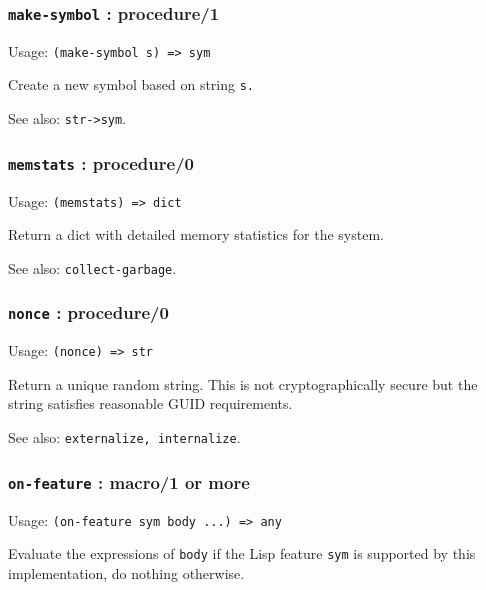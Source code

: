 \documentclass[
]{article}
\newcommand{\passthrough}[1]{#1}
\begin{document}
\hypertarget{make-symbol-procedure1}{%
\subsubsection{\texorpdfstring{\texttt{make-symbol} :
procedure/1}{make-symbol : procedure/1}}\label{make-symbol-procedure1}}

Usage: \passthrough{\lstinline!(make-symbol s) => sym!}

Create a new symbol based on string \passthrough{\lstinline!s.!}

See also: \passthrough{\lstinline!str->sym!}.

\hypertarget{memstats-procedure0}{%
\subsubsection{\texorpdfstring{\texttt{memstats} :
procedure/0}{memstats : procedure/0}}\label{memstats-procedure0}}

Usage: \passthrough{\lstinline!(memstats) => dict!}

Return a dict with detailed memory statistics for the system.

See also: \passthrough{\lstinline!collect-garbage!}.

\hypertarget{nonce-procedure0}{%
\subsubsection{\texorpdfstring{\texttt{nonce} :
procedure/0}{nonce : procedure/0}}\label{nonce-procedure0}}

Usage: \passthrough{\lstinline!(nonce) => str!}

Return a unique random string. This is not cryptographically secure but
the string satisfies reasonable GUID requirements.

See also: \passthrough{\lstinline!externalize, internalize!}.

\hypertarget{on-feature-macro1-or-more}{%
\subsubsection{\texorpdfstring{\texttt{on-feature} : macro/1 or
more}{on-feature : macro/1 or more}}\label{on-feature-macro1-or-more}}

Usage: \passthrough{\lstinline!(on-feature sym body ...) => any!}

Evaluate the expressions of \passthrough{\lstinline!body!} if the Lisp
feature \passthrough{\lstinline!sym!} is supported by this
implementation, do nothing otherwise.
\end{document}
